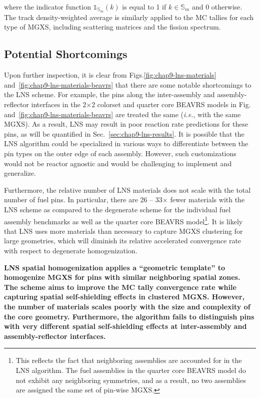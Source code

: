 \noindent where the indicator function $\mathbb{1}_{\mathbb{S}_{m}}(k)$ is equal to 1 if $k \in \mathbb{S}_{m}$ and 0 otherwise. The track density-weighted average is similarly applied to the \ac{MC} tallies for each type of \ac{MGXS}, including scattering matrices and the fission spectrum.

\subsection{Potential Shortcomings}
\label{sec:chap9-lns-shortcomings}

Upon further inspection, it is clear from Figs.\ref{fig:chap9-lns-materials} and~\ref{fig:chap9-lns-materials-beavrs} that there are some notable shortcomings to the \ac{LNS} scheme. For example, the pins along the inter-assembly and assembly-reflector interfaces in the 2$\times$2 colorset and quarter core \ac{BEAVRS} models in Fig.~ and~\ref{fig:chap9-lns-materials-beavrs} are treated the same (\textit{i.e.}, with the same \ac{MGXS}). As a result, \ac{LNS} may result in poor reaction rate predictions for these pins, as will be quantified in Sec.~\ref{sec:chap9-lns-results}. It is possible that the \ac{LNS} algorithm could be specialized in various ways to differentiate between the pin types on the outer edge of each assembly. However, such customizations would not be reactor agnostic and would be challenging to implement and generalize.

Furthermore, the relative number of \ac{LNS} materials does not scale with the total number of fuel pins. In particular, there are 26 -- 33$\times$ fewer materials with the \ac{LNS} scheme as compared to the degenerate scheme for the individual fuel assembly benchmarks as well as the quarter core \ac{BEAVRS} model\footnote{This reflects the fact that neighboring assemblies are accounted for in the \ac{LNS} algorithm. The fuel assemblies in the quarter core \ac{BEAVRS} model do not exhibit any neighboring symmetries, and as a result, no two assemblies are assigned the same set of pin-wise \ac{MGXS}.}. It is likely that \ac{LNS} uses more materials than necessary to capture \ac{MGXS} clustering for large geometries, which will diminish its relative accelerated convergence rate with respect to degenerate homogenization.

\begin{emphbox}
\textbf{\ac{LNS} spatial homogenization applies a ``geometric template'' to homogenize \ac{MGXS} for pins with similar neighboring spatial zones. The scheme aims to improve the \ac{MC} tally convergence rate while capturing spatial self-shielding effects in clustered \ac{MGXS}. However, the number of materials scales poorly with the size and complexity of the core geometry. Furthermore, the algorithm fails to distinguish pins with very different spatial self-shielding effects at inter-assembly and assembly-reflector interfaces.}
\end{emphbox}


